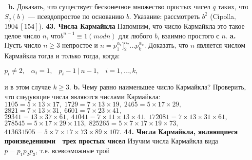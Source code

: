 \documentclass{mai_book}
\begin{document}
$\:$\newline\indent
\textbf{b.} Доказать, что существует бесконечное множество простых чисел $q$ таких, что $S_q(b)$ — псевдопростое по основанию $b$. Указание: рассмотреть $b^2$ (Cipolla, $1904\:[154]$).
\newpage
\textbf{43. Числа Кармайкла}
\newline \newline \indent
Напомним, что число Кармайкла это такое целое число $n$, что\newline $b^{n - 1} \equiv 1 (mod n)$ для любого $b$, взаимно простого с $n$.
\newline \indent
\textbf{a.} Пусть число $n \ge 3$ непростое и $n = p_1^{\alpha_1}]_2^{\alpha_2}\dots p_k^{\alpha_k}$. Доказать, что $n$ является числом Кармайкла тогда и только тогда, когда:
\begin{center}
$p_i \ne 2, \;\;\; \alpha_i = 1, \;\;\; p_i - 1 \:| \: n - 1, \;\;\; i = 1, \dots , k,$
\end{center}
и в этом случае $k \ge 3$.
\newline \indent
\textbf{b.} Чему равно наименьшее число Кармайкла? Проверить, что следующие числа являются числами Кармайкла: 
\newline \newline \indent
\hspace{40pt} $1105 = 5 \times 13 \times 17, \; 1729 = 7 \times 13 \times 19, \; 2465 = 5 \times 17 \times 29,$ \newline \indent
\hspace{85pt}$2821 = 7 \times 13 \times 31, \; 6601 = 7 \times 23 \times 41,$
\newline \indent
\hspace{16pt}$29341 = 13 \times 37 \times 61, \; 41041 = 7 \times 11 \times 13 \times 41, \; 172081 = 7 \times 13 \times 31 \times 61, $
\newline \indent
\hspace{55pt}$278545 = 5 \times 17 \times 29 \times 113, \; 825265 = 5 \times 7 \times 17 \times 19 \times 73, $
\newline \indent
\hspace{85pt}$413631505 = 5 \times 7 \times 17 \times 73 \times 89 \times 107.$
\newline \newline \indent
\textbf{44. Числа Кармайкла, являющиеся произведениями \newline \indent
$\;$ трех простых чисел}
\newline \newline \indent
Изучим числа Кармайкла вида $p = p_1 p_2 p_3$, т.е. всевозможные трой
\end{document}
